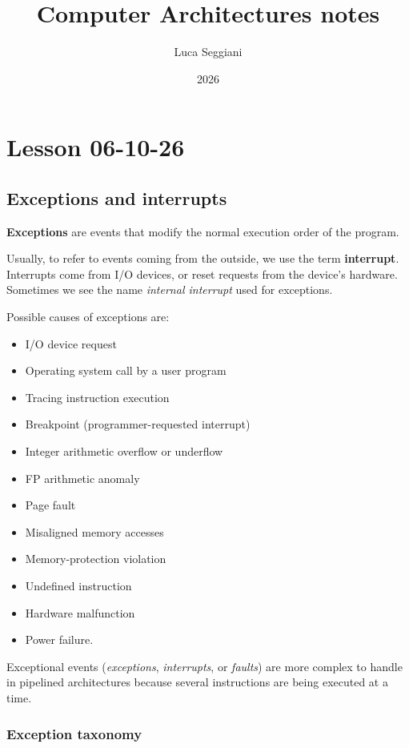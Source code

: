 \documentclass[a4paper,11pt]{article}
\title{Computer Architectures notes}
\author{Luca Seggiani}
\date{2026}
\begin{document}
\section{Lesson 06-10-26}

\thispagestyle{empty}
\pagestyle{fancy}

\subsection{Exceptions and interrupts}

\textbf{Exceptions} are events that modify the normal execution order of the program.

Usually, to refer to events coming from the outside, we use the term \textbf{interrupt}.
Interrupts come from I/O devices, or reset requests from the device's hardware.
Sometimes we see the name \textit{internal interrupt} used for exceptions.

Possible causes of exceptions are:
\begin{itemize}
	\item I/O device request
	\item Operating system call by a user program
	\item Tracing instruction execution
	\item Breakpoint (programmer-requested interrupt)
	\item Integer arithmetic overflow or underflow
	\item FP arithmetic anomaly
	\item Page fault
	\item Misaligned memory accesses
	\item Memory-protection violation
	\item Undefined instruction
	\item Hardware malfunction
	\item Power failure.
\end{itemize}

Exceptional events (\textit{exceptions}, \textit{interrupts}, or \textit{faults}) are more complex to handle in pipelined architectures because several instructions are being executed at a time.

\subsubsection{Exception taxonomy}
\end{document}
